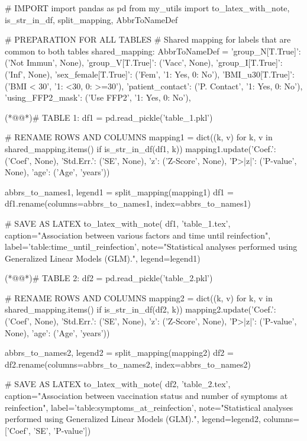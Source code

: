 \documentclass[11pt]{article}
\begin{document}
\begin{python}

# IMPORT
import pandas as pd
from my_utils import to_latex_with_note, is_str_in_df, split_mapping, AbbrToNameDef

# PREPARATION FOR ALL TABLES
# Shared mapping for labels that are common to both tables
shared_mapping: AbbrToNameDef = {
    'group_N[T.True]': ('Not Immun', None),
    'group_V[T.True]': ('Vacc', None),
    'group_I[T.True]': ('Inf', None),
    'sex_female[T.True]': ('Fem', '1: Yes, 0: No'),
    'BMI_u30[T.True]': ('BMI < 30', '1: <30, 0: >=30'),
    'patient_contact': ('P. Contact', '1: Yes, 0: No'),
    'using_FFP2_mask': ('Use FFP2', '1: Yes, 0: No'),
}

(*@@*)# TABLE 1:
df1 = pd.read_pickle('table_1.pkl')

# RENAME ROWS AND COLUMNS 
mapping1 = dict((k, v) for k, v in shared_mapping.items() if is_str_in_df(df1, k)) 
mapping1.update({'Coef.': ('Coef', None), 
                 'Std.Err.': ('SE', None),
                 'z': ('Z-Score', None),
                 'P>|z|': ('P-value', None),
                 'age': ('Age', 'years')})

abbrs_to_names1, legend1 = split_mapping(mapping1)
df1 = df1.rename(columns=abbrs_to_names1, index=abbrs_to_names1)

# SAVE AS LATEX
to_latex_with_note(
    df1, 'table_1.tex',
    caption="Association between various factors and time until reinfection", 
    label='table:time_until_reinfection',
    note="Statistical analyses performed using Generalized Linear Models (GLM).",
    legend=legend1)

(*@@*)# TABLE 2:
df2 = pd.read_pickle('table_2.pkl')

# RENAME ROWS AND COLUMNS  
mapping2 = dict((k, v) for k, v in shared_mapping.items() if is_str_in_df(df2, k)) 
mapping2.update({'Coef.': ('Coef', None), 
                 'Std.Err.': ('SE', None),
                 'z': ('Z-Score', None),
                 'P>|z|': ('P-value', None),
                 'age': ('Age', 'years')})

abbrs_to_names2, legend2 = split_mapping(mapping2)
df2 = df2.rename(columns=abbrs_to_names2, index=abbrs_to_names2)

# SAVE AS LATEX
to_latex_with_note(
    df2, 'table_2.tex',
    caption="Association between vaccination status and number of symptoms at reinfection", 
    label='table:symptoms_at_reinfection',
    note="Statistical analyses performed using Generalized Linear Models (GLM).",
    legend=legend2, 
    columns=['Coef', 'SE', 'P-value'])

\end{python}
\end{document}
